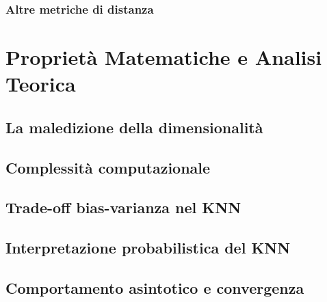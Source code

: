\subsubsection{Altre metriche di distanza}

\section{Proprietà Matematiche e Analisi Teorica}
\subsection{La maledizione della dimensionalità}
\subsection{Complessità computazionale}
\subsection{Trade-off bias-varianza nel KNN}
\subsection{Interpretazione probabilistica del KNN}
\subsection{Comportamento asintotico e convergenza}